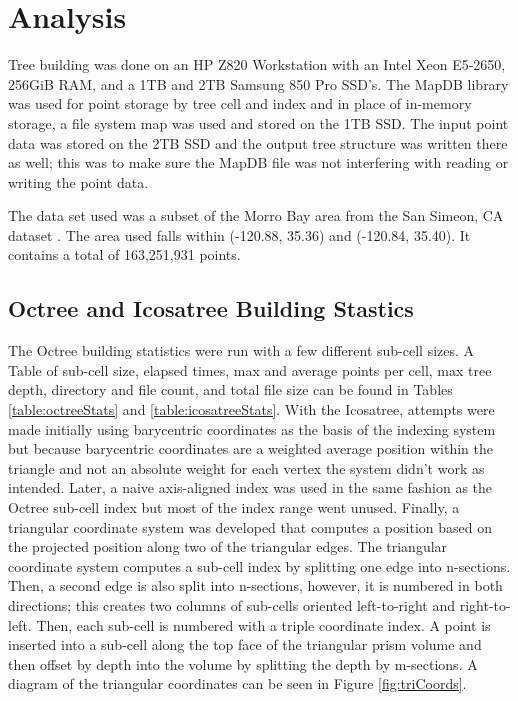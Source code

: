 \chapter{Analysis}

Tree building was done on an HP Z820 Workstation with an Intel Xeon E5-2650,
256GiB RAM, and a 1TB and 2TB Samsung 850 Pro SSD’s. The MapDB library was used
for point storage by tree cell and index and in place of in-memory storage, a
file system map was used and stored on the 1TB SSD. The input point data was
stored on the 2TB SSD and the output tree structure was written there as well;
this was to make sure the MapDB file was not interfering with reading or writing
the point data.

The data set used was a subset of the Morro Bay area from the San Simeon, CA
dataset \cite{15_opentopo_morrobay}. The area used falls within (-120.88, 35.36)
and (-120.84, 35.40).
It contains a total of 163,251,931 points.

\section{Octree and Icosatree Building Stastics}

The Octree building statistics were run with a few different sub-cell sizes. A
Table of sub-cell size, elapsed times, max and average points per cell, max tree
depth, directory and file count, and total file size can be found in Tables
\ref{table:octreeStats} and \ref{table:icosatreeStats}. With the Icosatree,
attempts were made initially using barycentric coordinates as the basis of the
indexing system but because barycentric coordinates are a weighted average
position within the triangle and not an absolute weight for each vertex the
system didn’t work as intended. Later, a naive axis-aligned index was used in
the same fashion as the Octree sub-cell index but most of the index range went
unused. Finally, a triangular coordinate system was developed that computes a
position based on the projected position along two of the triangular edges. The
triangular coordinate system computes a sub-cell index by splitting one edge
into n-sections. Then, a second edge is also split into n-sections, however, it
is numbered in both directions; this creates two columns of sub-cells oriented
left-to-right and right-to-left. Then, each sub-cell is numbered with a triple
coordinate index. A point is inserted into a sub-cell along the top face of the
triangular prism volume and then offset by depth into the volume by splitting
the depth by m-sections. A diagram of the triangular coordinates can be seen in
Figure \ref{fig:triCoords}.

